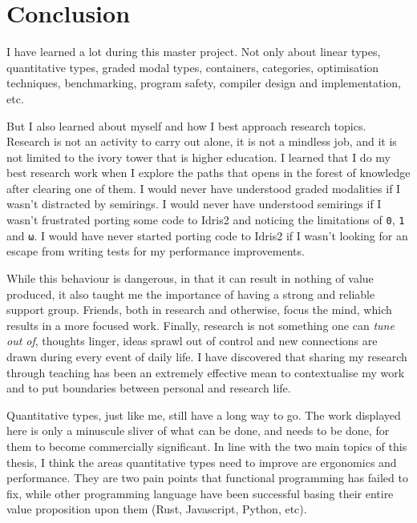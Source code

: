 \documentclass[
]{article}
\begin{document}
\newpage

\hypertarget{conclusion}{%
\section{Conclusion}\label{conclusion}}

I have learned a lot during this master project. Not only about linear
types, quantitative types, graded modal types, containers, categories,
optimisation techniques, benchmarking, program safety, compiler design
and implementation, etc.

But I also learned about myself and how I best approach research topics.
Research is not an activity to carry out alone, it is not a mindless
job, and it is not limited to the ivory tower that is higher education.
I learned that I do my best research work when I explore the paths that
opens in the forest of knowledge after clearing one of them. I would
never have understood graded modalities if I wasn't distracted by
semirings. I would never have understood semirings if I wasn't
frustrated porting some code to Idris2 and noticing the limitations of
\texttt{0}, \texttt{1} and \texttt{ω}. I would have never started
porting code to Idris2 if I wasn't looking for an escape from writing
tests for my performance improvements.

While this behaviour is dangerous, in that it can result in nothing of
value produced, it also taught me the importance of having a strong and
reliable support group. Friends, both in research and otherwise, focus
the mind, which results in a more focused work. Finally, research is not
something one can \emph{tune out of}, thoughts linger, ideas sprawl out
of control and new connections are drawn during every event of daily
life. I have discovered that sharing my research through teaching has
been an extremely effective mean to contextualise my work and to put
boundaries between personal and research life.

Quantitative types, just like me, still have a long way to go. The work
displayed here is only a minuscule sliver of what can be done, and needs
to be done, for them to become commercially significant. In line with
the two main topics of this thesis, I think the areas quantitative types
need to improve are ergonomics and performance. They are two pain points
that functional programming has failed to fix, while other programming
language have been successful basing their entire value proposition upon
them (Rust, Javascript, Python, etc).
\end{document}
